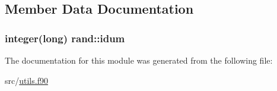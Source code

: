 \subsection{Member Data Documentation}
\hypertarget{classrand_a8271f5341966bf15edcabc95e23ffcec}{
\subsubsection[{idum}]{\setlength{\rightskip}{0pt plus 5cm}integer(long) rand\+::idum\hspace{0.3cm}{\ttfamily [private]}}}\label{classrand_a8271f5341966bf15edcabc95e23ffcec}


The documentation for this module was generated from the following file\+:\begin{DoxyCompactItemize}
\item 
src/\hyperlink{utils_8f90}{utils.\+f90}\end{DoxyCompactItemize}
